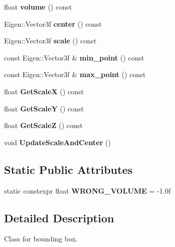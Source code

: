 \begin{DoxyCompactItemize}
float {\bfseries volume} () const
\item 
\mbox{\label{classBbox_aeea52d94952b3b0d6eb95eb7e9bdfa60}} 
Eigen\+::\+Vector3f {\bfseries center} () const
\item 
\mbox{\label{classBbox_adbd4cd66414ec9dd99a64dcc7fefa0eb}} 
Eigen\+::\+Vector3f {\bfseries scale} () const
\item 
\mbox{\label{classBbox_acabe3355373b58b56070fd1ead9fdef7}} 
const Eigen\+::\+Vector3f \& {\bfseries min\+\_\+point} () const
\item 
\mbox{\label{classBbox_a9c1593c5debe2ab4d9308d56b4a4fa99}} 
const Eigen\+::\+Vector3f \& {\bfseries max\+\_\+point} () const
\item 
\mbox{\label{classBbox_af31d201dfcf52443564e4a2e028008bd}} 
float {\bfseries Get\+ScaleX} () const
\item 
\mbox{\label{classBbox_a819de405229a7113aa1f55fc9a5e10a1}} 
float {\bfseries Get\+ScaleY} () const
\item 
\mbox{\label{classBbox_a80b58db650bee5a4ea7cfb6205aeab49}} 
float {\bfseries Get\+ScaleZ} () const
\item 
\mbox{\label{classBbox_aee6dac16a8833cb9a608a0fdafaf9772}} 
void {\bfseries Update\+Scale\+And\+Center} ()
\end{DoxyCompactItemize}
\subsection*{Static Public Attributes}
\begin{DoxyCompactItemize}
\item 
\mbox{\label{classBbox_a42eb77afd3b8b1c32869c01ecf073bc3}} 
static constexpr float {\bfseries W\+R\+O\+N\+G\+\_\+\+V\+O\+L\+U\+ME} = -\/1.\+0f
\end{DoxyCompactItemize}


\subsection{Detailed Description}
Class for bounding box. 

